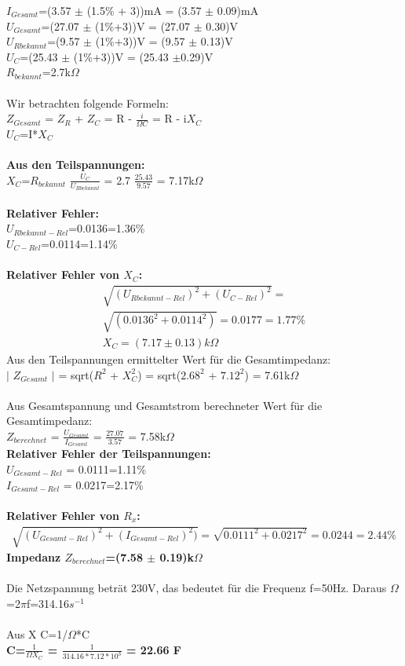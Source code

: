 \documentclass{article}
\begin{document}
$I_{Gesamt}$=(3.57 $\pm$ (1.5\% + 3))mA = (3.57 $\pm$ 0.09)mA\\
$U_{Gesamt}$=(27.07 $\pm$ (1\%+3))V = (27.07 $\pm$ 0.30)V\\
$U_{Rbekannt}$=(9.57 $\pm$ (1\%+3))V = (9.57 $\pm$ 0.13)V\\
$U_C$=(25.43 $\pm$ (1\%+3))V = (25.43 $\pm$0.29)V\\
$R_{bekannt}$=2.7k$\Omega$\\
\\
Wir betrachten folgende Formeln:\\
$Z_{Gesamt}$ = $Z_R$ + $Z_C$ = R - $\frac{i}{\Omega C}$ = R - i$X_C$\\
$U_C$=I*$X_C$\\
\\
\textbf{Aus den Teilspannungen:}\\
$X_C$=$R_{bekannt}$ $\frac{U_C}{U_{Rbekannt}}$ = 2.7 $\frac{25.43}{9.57}$ = 7.17k$\Omega$\\
\\
\textbf{Relativer Fehler:}\\
$U_{Rbekannt-Rel}$=0.0136=1.36\%\\
$U_{C-Rel}$=0.0114=1.14\%\\
\\
\textbf{Relativer Fehler von $X_C$:}\\
\begin{gather}
\sqrt{(U_{Rbekannt-Rel})^2+(U_{C-Rel})^2}=\\
\sqrt{(0.0136^2+0.0114^2)}=0.0177=1.77\% \\
X_C=(7.17 \pm 0.13)k\Omega
\end{gather} 
Aus den Teilspannungen ermittelter Wert für die Gesamtimpedanz:\\
$\lvert$ $Z_{Gesamt}$ $\rvert$ = sqrt($R^2$ + $X_C^2$) = sqrt($2.68^2$ + $7.12^2$) = 7.61k$\Omega$\\
\\
Aus Gesamtspannung und Gesamtstrom berechneter Wert für die Gesamtimpedanz:\\
$Z_{berechnet}$ = $\frac{U_{Gesamt}}{I_{Gesamt}}$ = $\frac{27.07}{3.57}$ = 7.58k$\Omega$\\

\textbf{Relativer Fehler der Teilspannungen:}\\
$U_{Gesamt-Rel}$ = 0.0111=1.11\%\\
$I_{Gesamt-Rel}$ = 0.0217=2.17\%\\
\\
\textbf{Relativer Fehler von $R_x$:}\\
\begin{gather}	
\sqrt{(U_{Gesamt-Rel})^2+(I_{Gesamt-Rel})^2)}=\sqrt{0.0111^2+0.0217^2}=0.0244=2.44\%
\end{gather}
\textbf{Impedanz $Z_{berechnet}$=(7.58 $\pm$ 0.19)k$\Omega$}\\
\\
Die Netzspannung beträt 230V, das bedeutet für die Frequenz f=50Hz. Daraus $\Omega$=2$\pi$f=314.16$s^{-1}$\\
\\
Aus X C=1/$\Omega$*C\\
\textbf{C=$\frac{1}{\Omega X_C}$ = $\frac{1}{314.16*7.12*10^3}$ = 22.66 F}
\end{document}
